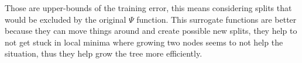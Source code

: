 Those are upper-bounds of the training error, this means considering 
splits that would be excluded by the original $\Psi$ function.
This surrogate functions are better because they can move things around and 
create possible new splits, they help to not get stuck in local minima where 
growing two nodes seems to not help the situation, thus they help 
grow the tree more efficiently.